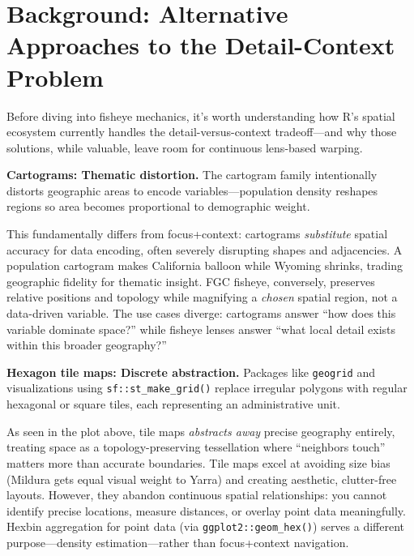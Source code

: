 \section{Background: Alternative Approaches to the Detail-Context Problem}\label{background-alternative-approaches-to-the-detail-context-problem}

Before diving into fisheye mechanics, it's worth understanding how R's spatial ecosystem currently handles the detail-versus-context tradeoff---and why those solutions, while valuable, leave room for continuous lens-based warping.

\textbf{Cartograms: Thematic distortion.} The cartogram family \citep{gastner2004} intentionally distorts geographic areas to encode variables---population density reshapes regions so area becomes proportional to demographic weight.


This fundamentally differs from focus+context: cartograms \emph{substitute} spatial accuracy for data encoding, often severely disrupting shapes and adjacencies. A population cartogram makes California balloon while Wyoming shrinks, trading geographic fidelity for thematic insight. FGC fisheye, conversely, preserves relative positions and topology while magnifying a \emph{chosen} spatial region, not a data-driven variable. The use cases diverge: cartograms answer ``how does this variable dominate space?'' while fisheye lenses answer ``what local detail exists within this broader geography?''

\textbf{Hexagon tile maps: Discrete abstraction.} Packages like \texttt{geogrid} and visualizations using \texttt{sf::st\_make\_grid()} replace irregular polygons with regular hexagonal or square tiles, each representing an administrative unit.


As seen in the plot above, tile maps \emph{abstracts away} precise geography entirely, treating space as a topology-preserving tessellation where ``neighbors touch'' matters more than accurate boundaries. Tile maps excel at avoiding size bias (Mildura gets equal visual weight to Yarra) and creating aesthetic, clutter-free layouts. However, they abandon continuous spatial relationships: you cannot identify precise locations, measure distances, or overlay point data meaningfully. Hexbin aggregation for point data (via \texttt{ggplot2::geom\_hex()}) serves a different purpose---density estimation---rather than focus+context navigation.


